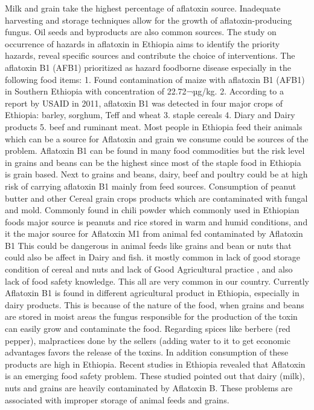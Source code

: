 \documentclass[
  letterpaper,
  DIV=11,
  numbers=noendperiod]{scrartcl}
\begin{document}
Milk and grain take the highest percentage of aflatoxin source.
Inadequate harvesting and storage techniques allow for the growth of
aflatoxin-producing fungus. Oil seeds and byproducts are also common
sources. The study on occurrence of hazards in aflatoxin in Ethiopia
aims to identify the priority hazards, reveal specific sources and
contribute the choice of interventions. The aflatoxin B1 (AFB1)
prioritized as hazard foodborne disease especially in the following food
items: 1. Found contamination of maize with aflatoxin B1 (AFB1) in
Southern Ethiopia with concentration of 22.72¬µg/kg. 2. According to a
report by USAID in 2011, aflatoxin B1 was detected in four major crops
of Ethiopia: barley, sorghum, Teff and wheat 3. staple cereals 4. Diary
and Dairy products 5. beef and ruminant meat. Most people in Ethiopia
feed their animals which can be a source for Aflatoxin and grain we
consume could be sources of the problem. Aflatoxin B1 can be found in
many food commodities but the risk level in grains and beans can be the
highest since most of the staple food in Ethiopia is grain based. Next
to grains and beans, dairy, beef and poultry could be at high risk of
carrying aflatoxin B1 mainly from feed sources. Consumption of peanut
butter and other Cereal grain crops products which are contaminated with
fungal and mold. Commonly found in chili powder which commonly used in
Ethiopian foods major source is peanuts and rice stored in warm and
humid conditions, and it the major source for Aflatoxin M1 from animal
fed contaminated by Aflatoxin B1 This could be dangerous in animal feeds
like grains and bean or nuts that could also be affect in Dairy and
fish. it mostly common in lack of good storage condition of cereal and
nuts and lack of Good Agricultural practice , and also lack of food
safety knowledge. This all are very common in our country. Currently
Aflatoxin B1 is found in different agricultural product in Ethiopia,
especially in dairy products. This is because of the nature of the food,
when grains and beans are stored in moist areas the fungus responsible
for the production of the toxin can easily grow and contaminate the
food. Regarding spices like berbere (red pepper), malpractices done by
the sellers (adding water to it to get economic advantages favors the
release of the toxins. In addition consumption of these products are
high in Ethiopia. Recent studies in Ethiopia revealed that Aflatoxin is
an emerging food safety problem. These studied pointed out that dairy
(milk), nuts and grains are heavily contaminated by Aflatoxin B. These
problems are associated with improper storage of animal feeds and
grains.
\end{document}
